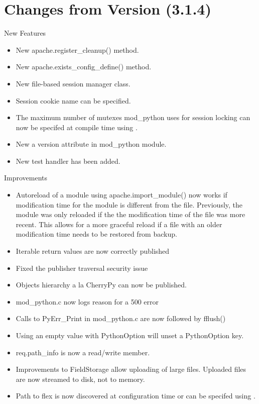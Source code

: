 \chapter{Changes from Version (3.1.4)\label{app-changes}}

  
  New Features

  \begin{itemize}
    \item
      New apache.register_cleanup() method.
    \item
      New apache.exists_config_define() method.
    \item
      New file-based session manager class.
    \item
      Session cookie name can be specified.
    \item
      The maximum number of mutexes mod_python uses for session locking
      can now be specifed at compile time using 
      .
    \item
      New a version attribute in mod_python module.
    \item
      New test handler  has been added.
  \end{itemize}

  Improvements

  \begin{itemize}
    \item
      Autoreload of a module using apache.import_module() now works if
      modification time for the module is different from the file.
      Previously, the module was only reloaded if the the modification 
      time of the file was more recent. This allows for a more graceful
      reload if a file with an older modification time needs to be
      restored from backup.
    \item
      Iterable return values are now correctly published
    \item
      Fixed the publisher traversal security issue
    \item
      Objects hierarchy a la CherryPy can now be published.
    \item
      mod_python.c now logs reason for a 500 error
    \item
      Calls to PyErr_Print in mod_python.c are now followed by fflush()
    \item
      Using an empty value with PythonOption will unset a PythonOption key.
    \item
      req.path_info is now a read/write member.
    \item
      Improvements to FieldStorage allow uploading of large files. Uploaded
      files are now streamed to disk, not to memory.
    \item
      Path to flex is now discovered at configuration time or can be
      specifed using .
  \end{itemize}

